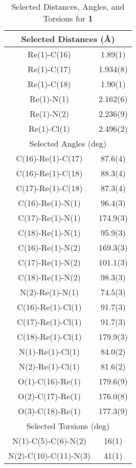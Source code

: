 \begin{table}[htbp]
  \caption{Selected Distances, Angles, and Torsions for \textbf{1}}
  \centering
    \begin{tabular}{cc}
    \toprule
    \multicolumn{2}{c}{Selected Distances (\r{A})} \\
    \midrule
    Re(1)-C(16) & 1.89(1) \\
    Re(1)-C(17) & 1.934(8) \\
    Re(1)-C(18) & 1.90(1) \\
    Re(1)-N(1) & 2.162(6) \\
    Re(1)-N(2) & 2.236(9) \\
    Re(1)-Cl(1) & 2.496(2) \\ \midrule
    \multicolumn{2}{c}{Selected Angles (deg)} \\ \midrule
    C(16)-Re(1)-C(17) & 87.6(4) \\
    C(16)-Re(1)-C(18) & 88.3(4) \\
    C(17)-Re(1)-C(18) & 87.3(4) \\
    C(16)-Re(1)-N(1) & 96.4(3) \\
    C(17)-Re(1)-N(1) & 174.9(3) \\
    C(18)-Re(1)-N(1) & 95.9(3) \\
    C(16)-Re(1)-N(2) & 169.3(3) \\
    C(17)-Re(1)-N(2) & 101.1(3) \\
    C(18)-Re(1)-N(2) & 98.3(3) \\
    N(2)-Re(1)-N(1) & 74.5(3) \\
    C(16)-Re(1)-Cl(1) & 91.7(3) \\
    C(17)-Re(1)-Cl(1) & 91.7(3) \\
    C(18)-Re(1)-Cl(1) & 179.9(3) \\
    N(1)-Re(1)-Cl(1) & 84.0(2) \\
    N(2)-Re(1)-Cl(1) & 81.6(2) \\
    O(1)-C(16)-Re(1) & 179.6(9) \\
    O(2)-C(17)-Re(1) & 176.0(8) \\ 
    O(3)-C(18)-Re(1) & 177.3(9) \\ \midrule
    \multicolumn{2}{c}{Selected Torsions (deg)} \\ \midrule
    N(1)-C(5)-C(6)-N(2) &  16(1) \\
    N(2)-C(10)-C(11)-N(3) & 41(1) \\
    \bottomrule
    \end{tabular}%
  \label{tab.da1}%
\end{table}%



